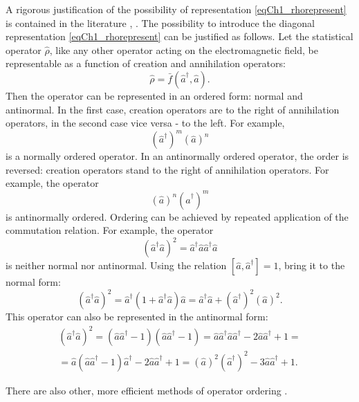 A rigorous justification of the possibility of representation \eqref{eqCh1_rhorepresent}
is contained in the literature \cite{bQuantumOpticsAndRadioPhisicsLecture1966},
\cite{bKaluderSudershan1970}. 
The possibility to introduce the diagonal representation
\eqref{eqCh1_rhorepresent} can be justified as follows. Let the
statistical operator $\hat{\rho}$, like any other operator
acting on the electromagnetic field, be representable as
a function of creation and annihilation operators:
\[
\hat{\rho} = \bar{f}\left(\hat{a}^{\dag}, \hat{a}\right).
\]
Then the operator can be represented in an ordered form: normal
and antinormal. In the first case, creation operators are to the right of annihilation operators,
in the second case vice versa - to the left.
For example, 
\[
\left(\hat{a}^{\dag}\right)^m\left(\hat{a}\right)^n
\]
is a normally ordered operator. In an antinormally ordered
operator, the order is reversed: creation operators stand to the right of
annihilation operators. For example, the operator 
\[
\left(\hat{a}\right)^n\left(\hat{a}^{\dag}\right)^m
\]
is antinormally ordered. Ordering can be achieved by repeated
application of the commutation relation. For example, the operator  
\[
\left(\hat{a}^{\dag}\hat{a}\right)^2 =
\hat{a}^{\dag}\hat{a}\hat{a}^{\dag}\hat{a} 
\]
is neither normal nor antinormal. Using the relation
$\left[\hat{a},\hat{a}^{\dag}\right] = 1$,
bring it to the normal form: 
\[
\left(\hat{a}^{\dag}\hat{a}\right)^2 = \hat{a}^{\dag}\left(1 +
\hat{a}^{\dag}\hat{a}\right)\hat{a} = 
\hat{a}^{\dag}\hat{a} + \left(\hat{a}^{\dag}\right)^2\left(\hat{a}\right)^2.
\]
This operator can also be represented in the antinormal form:
\begin{eqnarray}
\left(\hat{a}^{\dag}\hat{a}\right)^2 = 
\left(\hat{a}\hat{a}^{\dag} - 1\right) \left(\hat{a}\hat{a}^{\dag} -
1\right) = \hat{a}\hat{a}^{\dag} \hat{a}\hat{a}^{\dag} - 2
\hat{a}\hat{a}^{\dag} + 1 =
\nonumber \\
= \hat{a}\left(\hat{a}\hat{a}^{\dag} - 1\right)\hat{a}^{\dag} -
2\hat{a}\hat{a}^{\dag} + 1 = 
\left(\hat{a}\right)^2\left(\hat{a}^{\dag}\right)^2 - 3
\hat{a}\hat{a}^{\dag} + 1.
\nonumber
\end{eqnarray}

There are also other, more efficient methods of operator ordering
\cite{bLuisell1972}.


